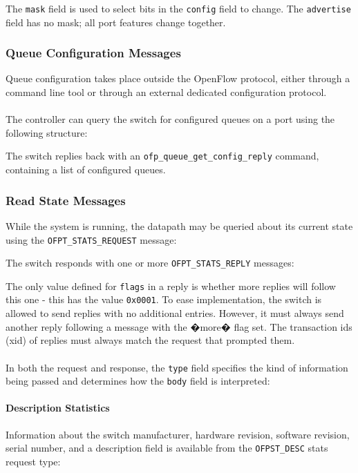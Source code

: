 
The \verb|mask| field is used to select bits in the \verb|config| field to change.  The \verb|advertise| field has no mask; all port features change together.

\subsubsection{Queue Configuration Messages}
Queue configuration takes place outside the OpenFlow protocol, either
  through a command line tool or through an external dedicated configuration
protocol.
\\\\
The controller can query the switch for configured queues on a port
using the following structure:

The switch replies back with an \verb|ofp_queue_get_config_reply| command, containing
a list of configured queues.




\subsubsection{Read State Messages}
While the system is running, the datapath may be queried about its current state using the \verb|OFPT_STATS_REQUEST| message:


The switch responds with one or more \verb|OFPT_STATS_REPLY| messages:


The only value defined for \verb|flags| in a reply is whether more replies will follow this one - this has the value \verb|0x0001|.  To ease implementation, the switch is allowed to send replies with no additional entries.  However, it must always send another reply following a message with the �more� flag set.  The transaction ids (xid) of replies must always match the request that prompted them.
\\\\
In both the request and response, the \verb|type| field specifies the kind of information being passed and determines how the \verb|body| field is interpreted:



\paragraph{Description Statistics}
Information about the switch manufacturer, hardware revision, software revision, serial number, and a description field is available from the \verb|OFPST_DESC| stats request type:

